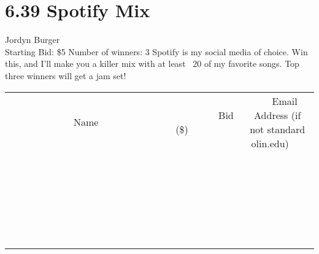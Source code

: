 \documentclass[11pt]{article}
\begin{document}
\section*{6.39 Spotify Mix}
Jordyn Burger
\\
Starting Bid: \$5
\newline
Number of winners: 3
\newline
Spotify is my social media of choice. Win this, and I'll make you a killer mix with at least ~20 of my favorite songs. Top three winners will get a jam set!
\\[6ex]
\begin{tabular}{c c c}
~~~~~~~~~~~~~Name~~~~~~~~~~~~~ & ~~~~~~~~~Bid (\$)~~~~~~~~~  & ~~~Email Address (if not standard olin.edu)~~~\\
 & & \\
\hline
 & & \\
\hline
 & & \\
\hline
 & & \\
\hline
 & & \\
\hline
 & & \\
\hline
 & & \\
\hline
 & & \\
\hline
 & & \\
\hline
 & & \\
\hline
 & & \\
\hline
 & & \\
\hline
 & & \\
\hline
 & & \\
\hline
 & & \\
\hline
 & & \\
\hline
 & & \\
\hline
 & & \\
\hline
 & & \\
\hline
 & & \\
\hline
 & & \\
\hline
 & & \\
\hline
 & & \\
\hline
 & & \\
\hline
 & & \\
\hline
 & & \\
\hline
\end{tabular}
\newpage
\end{document}

